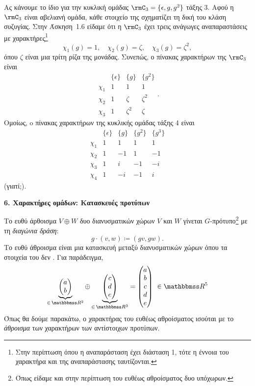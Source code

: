 \documentclass[12pt,a4paper,reqno]{amsart}
\begin{document}
Ας κάνουμε το ίδιο για την κυκλική ομάδας $\rmC_3 = \{\epsilon, g, g^2\}$ τάξης 3. Αφού η $\rmC_3$ είναι αβελιανή ομάδα, κάθε στοιχείο της σχηματίζει τη δική του κλάση συζυγίας. Στην Άσκηση~1.6 είδαμε ότι η $\rmC_3$ έχει τρεις ανάγωγες αναπαραστάσεις με χαρακτήρες\footnote{Στην περίπτωση όπου η αναπαράσταση έχει διάσταση 1, τότε η έννοια του χαρακτήρα και της αναπαράστασης ταυτίζονται.}
\[
\chi_1(g) = 1, \quad \chi_2(g) = \zeta, \quad \chi_3(g) = \zeta^2,
\]
όπου $\zeta$ είναι μια τρίτη ρίζα της μονάδας. Συνεπώς, ο πίνακας χαρακτήρων της $\rmC_3$ είναι 
\[
\begin{array}{l|c|c|c}
           & \{\epsilon\} & \{g\}   & \{g^2\} \\ \hline
    \chi_1 & 1            & 1       & 1 \\ \hline
    \chi_2 & 1            & \zeta   & \zeta^2 \\ \hline
    \chi_3 & 1            & \zeta^2 & \zeta
\end{array}.
\]
Ομοίως, o πίνακας χαρακτήρων της κυκλικής ομάδας τάξης 4 είναι 
\[
\begin{array}{l|c|c|c|c}
           & \{\epsilon\} & \{g\}   & \{g^2\} & \{g^3\} \\ \hline
    \chi_1 & 1            & 1       & 1       & 1       \\ \hline
    \chi_2 & 1            & -1      & 1       & -1      \\ \hline
    \chi_3 & 1            & i       & -1      & -i      \\ \hline 
    \chi_4 & 1            & -i      & -1      & i      
\end{array}
\]
(γιατί;).

\newpage

\setcounter{section}{6}
\setcounter{theorem}{0}
\begin{center}
    \textbf{6. Χαρακτήρες ομάδων: Κατασκευές προτύπων
}
\end{center}

Το ευθύ άρθοισμα $V\oplus W$ δυο διανυσματικών χώρων $V$ και $W$ γίνεται $G$-πρότυπο\footnote{Όπως είδαμε και στην περίπτωση του ευθέως αθροίσματος δυο υπόχωρων.} με τη \emph{διαγώνια δράση}:
\[
g\cdot(v,w) \coloneqq (gv,gw).
\]
Το ευθύ άθροισμα είναι μια κατασκευή μεταξύ διανυσματικών χώρων όπου τα στοιχεία του δεν . Για παράδειγμα, 
\[
\underbrace{\begin{pmatrix}
    a \\ 
    b
\end{pmatrix}}_{\in \, \RR^2}
\oplus
\underbrace{\begin{pmatrix}
    c \\ 
    d \\ 
    e
\end{pmatrix}}_{\in \, \RR^3}
=
\begin{pmatrix}
    a \\ 
    b \\ 
    c \\ 
    d \\ 
    e
\end{pmatrix} \ \in \RR^5
\]
Όπως θα δούμε παρακάτω, ο χαρακτήρας του ευθέως αθροίσματος ισούται με το \emph{άθροισμα} των χαρακτήρων των αντίστοιχων προτύπων.
\end{document}

